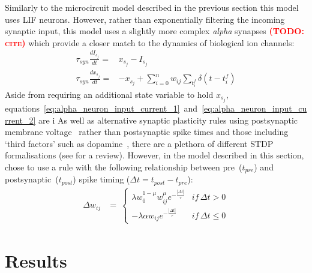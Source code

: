 \documentclass[utf8]{frontiersSCNS} %
\newcommand{\todo}[1]{\textbf{\textsc{\textcolor{red}{(TODO: #1)}}}}
\begin{document}
Similarly to the microcircuit model described in the previous section this model uses LIF neurons.
However, rather than exponentially filtering the incoming synaptic input, this model uses a slightly more complex \textit{alpha} synapses \todo{cite} which provide a closer match to the dynamics of biological ion channels:
%
\begin{align}
    \tau_{syn} \frac{dI_{s_{j}}}{dt} = & x_{s_{j}} - I_{s_{j}} \label{eq:alpha_neuron_input_current_1}\\ 
    \tau_{syn} \frac{dx_{s_{j}}}{dt} = & -x_{s_{j}} + \sum_{i=0}^{n} w_{ij} \sum_{t_{i}^{f}}  \delta(t - t_{i}^{f}) \label{eq:alpha_neuron_input_current_2}
\end{align}
%
Aside from requiring an additional state variable to hold $x_{s_{j}}$, equations~\ref{eq:alpha_neuron_input_current_1}~and~\ref{eq:alpha_neuron_input_current_2} are i
As well as alternative synaptic plasticity rules using postsynaptic membrane voltage~\citep{Brader2007,Clopath2010c} rather than postsynaptic spike times and those including `third factors' such as dopamine~\citep{Izhikevich2007}, there are a plethora of different STDP formalisations (see \citet{Morrison2008} for a review).
However, in the model described in this section, \citet{Morrison2007} chose to use a rule with the following relationship between pre~($t_{pre}$) and postsynaptic~($t_{post}$) spike timing ($\Delta t = t_{post} - t_{pre}$):
%
\begin{align}
    \Delta w_{ij} & = \
        \begin{cases}
            \lambda w_{0}^{1-\mu} w_{ij}^{\mu} e^{-\frac{|\Delta t|}{\tau}} & if\, \Delta t>0\\
            -\lambda \alpha w_{ij} e^{-\frac{|\Delta t|}{\tau}}             & if\, \Delta t\leq0
        \end{cases}
\end{align}
%
\section{Results}
\end{document}
